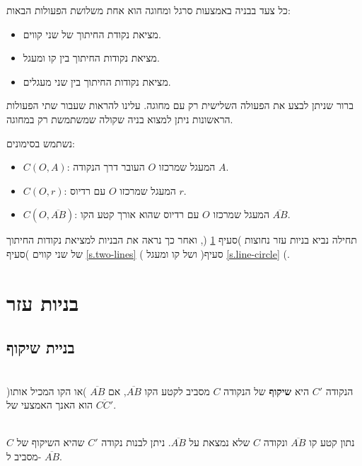 כל צעד בבניה באמצעות סרגל ומחוגה הוא אחת משלושת הפעולות הבאות:
\begin{itemize}
\item
מציאת נקודת החיתוך של שני קווים.
\item
מציאת נקודות החיתוך בין קו ומעגל.
\item
מציאת נקודות החיתוך בין שני מעגלים.
\end{itemize}
ברור שניתן לבצע את הפעולה השלישית רק עם מחוגה. עלינו להראות שעבור שתי הפעולות הראשונות ניתן למצוא בניה שקולה שמשתמשת רק במחוגה.


נשתמש בסימונים:
\begin{itemize}
\item $C(O,A)$: 
המעגל שמרכזו
$O$
העובר דרך הנקודה
$A$.
\item $C(O,r)$:
המעגל שמרכזו
$O$
עם רדיוס
$r$.
\item $C(O,\overline{AB})$:
המעגל שמרכזו
$O$
עם רדיוס שהוא אורך קטע הקו
$\overline{AB}$.
\end{itemize}

תחילה נביא בניות עזר נחוצות )סעיף
\ref{s.auxiliary}%
(,
ואחר כך נראה את הבניות למציאת נקודות החיתוך של שני קווים )סעיף
\ref{s.two-lines}%
( ושל קו ומעגל )סעיף
\ref{s.line-circle}%
(.



\section{%
בניות עזר%
}\label{s.auxiliary}

\subsection{בניית שיקוף}
\begin{definition}\mbox{}\\
הנקודה
$C'$
היא
\textbf{%
שיקוף%
}
של הנקודה
$C$
מסביב לקטע הקו
$\overline{AB}$,
אם 
$\overline{AB}$
)או הקו המכיל אותו( הוא האנך האמצעי של
$\overline{CC'}$.
\end{definition}

\vspace{-3ex}

\begin{theorem}\mbox{}\label{thm.reflection}\\
נתון קטע קו
$\overline{AB}$
ונקודה 
$C$
שלא נמצאת על
$\overline{AB}$.
ניתן לבנות נקודה 
$C'$
שהיא השיקוף של
$C$
מסביב ל-%
$\overline{AB}$.
\end{theorem}

